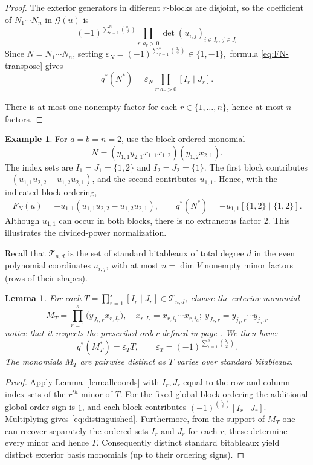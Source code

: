 \documentclass[10pt]{amsart}
\newtheorem{lemma}[theorem]{Lemma}
\theoremstyle{definition}
\newtheorem*{example}{Example}
\theoremstyle{remark}
\begin{document}
\begin{proof}
The exterior generators in different $r$-blocks are disjoint,
so the coefficient of $N_1\cdots N_n$ in $\mathcal G(u)$ is
\[
 (-1)^{\sum_{r=1}^n\binom{a_r}{2}}
 \prod_{r:a_r>0}\det(u_{i,j})_{i\in I_r,\,j\in J_r}
\]
Since $N=N_1\cdots N_n$, setting
\(\varepsilon_N=(-1)^{\sum_{r=1}^n\binom{a_r}{2}}\in\{1,-1\},\)
formula \eqref{eq:FN-transpose} gives
\begin{equation}\label{foco}
q^*(N^*)=\varepsilon_N\prod_{r:a_r>0}[I_r\mid J_r].
\end{equation}
 
There is at most one nonempty factor for each
$r\in\{1,\ldots,n\}$, hence at most $n$ factors.
\end{proof}

\begin{example}\label{ex:two-index-product}
For $a=b=n=2$, use the block-ordered monomial
\[
 N=(y_{1,1}y_{2,1}x_{1,1}x_{1,2})(y_{1,2}x_{2,1}).
\]
The index sets are $I_1=J_1=\{1,2\}$ and
$I_2=J_2=\{1\}$. The first block contributes
$-(u_{1,1}u_{2,2}-u_{1,2}u_{2,1})$, and the second contributes $u_{1,1}$.
Hence, with the indicated block ordering,
\[
 F_N(u)=-u_{1,1}(u_{1,1}u_{2,2}-u_{1,2}u_{2,1}),\qquad
 q^*(N^*)=- u_{1,1}[\{1,2\}\mid\{1,2\}].
\]
Although $u_{1,1}$ can occur in both blocks, there is no extraneous
factor $2$. This illustrates the divided-power normalization.
\end{example}


 
Recall that $\mathcal T_{n,d}$ is the set of standard bitableaux of
total degree $d$ in the even polynomial coordinates $ u_{i,j}$,
with at most $n=\dim V$ nonempty minor factors (rows of their shapes).

\begin{lemma}\label{lem:distinguished}
For each
$T=\prod_{r=1}^s[I_r\mid J_r]\in\mathcal T_{n,d}$, choose the
exterior monomial
\[
 M_T=\prod_{r=1}^{s}\bigl(y_{ J_r,r}x_{r,I_r}\bigr),\quad x_{r,I_r}=x_{r,i_1 }\cdots x_{r,i_a };\ 
   y_{ J_r,r}=y_{ j_1,r}\cdots y_{ j_a,r}
\]
notice that it respects the prescribed order defined in page \pageref{order}. We then have:\begin{equation}\label{eq:distinguished}
 q^*(M_T^*)=\varepsilon_T T,\qquad
 \varepsilon_T=(-1)^{\sum_{r=1}^s\binom{\lambda_r}{2}}.
\end{equation}
The monomials $M_T$ are pairwise distinct as $T$ varies over standard
bitableaux.
\end{lemma}
\begin{proof}
Apply Lemma~\ref{lem:allcoords} with $I_r,J_r$ equal to the
row and column index sets of the $r^{th}$ minor of $T$. For the fixed global block ordering the additional global-order sign is $1$,
and each block contributes $(-1)^{\binom{\lambda_r}{2}}[I_r\mid J_r]$.
Multiplying gives \eqref{eq:distinguished}. Furthermore, from the
support of $M_T$ one can recover separately the ordered sets
$I_r$ and $J_r$ for each $r$; these determine every minor and hence
$T$. Consequently distinct standard bitableaux yield distinct
exterior basis monomials (up to their ordering signs).
\end{proof}
\end{document}
